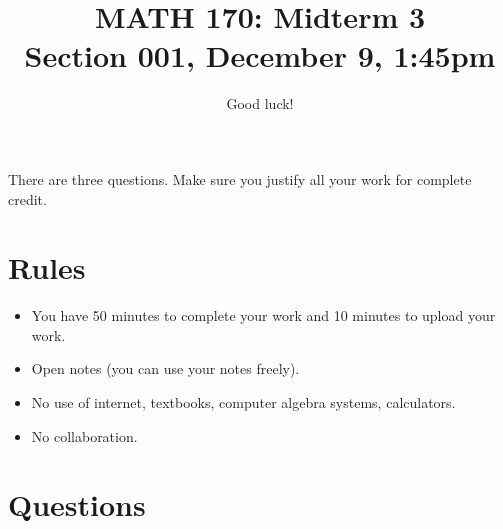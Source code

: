 \documentclass[12pt]{amsart}
\title{ MATH 170: Midterm 3 \\
\tiny{Section 001, December 9, 1:45pm}}
\author{Good luck!}
\date{}
\begin{document}
\maketitle

There are three questions. Make sure you justify all your work for complete credit.

\section*{Rules}

\begin{itemize}[leftmargin=*]
    \item You have 50 minutes to complete your work and 10 minutes to upload your work.
    \item Open notes (you can use your notes freely).
    \item No use of internet, textbooks, computer algebra systems, calculators. 
    \item No collaboration.
\end{itemize}

\section*{Questions}
\end{document}
